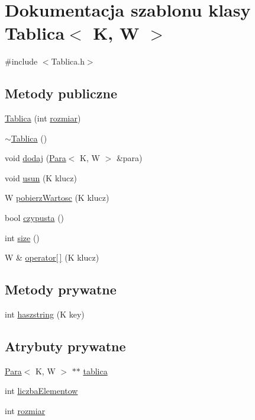 \hypertarget{class_tablica}{\section{\-Dokumentacja szablonu klasy \-Tablica$<$ \-K, \-W $>$}
\label{class_tablica}
}


{\ttfamily \#include $<$\-Tablica.\-h$>$}

\subsection*{\-Metody publiczne}
\begin{DoxyCompactItemize}
\item 
\hyperlink{class_tablica_ae1408ffc077347605b61ea0899ddebed}{\-Tablica} (int \hyperlink{class_tablica_a40b3c86ceb2ec860b9d19ce0e866b406}{rozmiar})
\item 
\hyperlink{class_tablica_aabb6e01e32fd2d32ddcfba2c10b9ec5e}{$\sim$\-Tablica} ()
\item 
void \hyperlink{class_tablica_aebb17d3366e37c8b4852df08eae2a1de}{dodaj} (\hyperlink{class_para}{\-Para}$<$ \-K, \-W $>$ \&para)
\item 
void \hyperlink{class_tablica_a061a219dd25c6696940f40226d99a99d}{usun} (\-K klucz)
\item 
\-W \hyperlink{class_tablica_a6de46e3062f16d78c4cb2cf18c9b0de1}{pobierz\-Wartosc} (\-K klucz)
\item 
bool \hyperlink{class_tablica_a19d8da0353d73517375cf6b2984f9d5c}{czypusta} ()
\item 
int \hyperlink{class_tablica_aabc40f316cf398a07e3035b1c4adc256}{size} ()
\item 
\-W \& \hyperlink{class_tablica_a7f5a2d2ebe594ec98dd38dfbbb83497d}{operator\mbox{[}$\,$\mbox{]}} (\-K klucz)
\end{DoxyCompactItemize}
\subsection*{\-Metody prywatne}
\begin{DoxyCompactItemize}
\item 
int \hyperlink{class_tablica_a8fd66d75553eb44aa043f917fd9317dc}{haszstring} (\-K key)
\end{DoxyCompactItemize}
\subsection*{\-Atrybuty prywatne}
\begin{DoxyCompactItemize}
\item 
\hyperlink{class_para}{\-Para}$<$ \-K, \-W $>$ $\ast$$\ast$ \hyperlink{class_tablica_a0d6b03ac0a2b996d4096038ef9315e9a}{tablica}
\item 
int \hyperlink{class_tablica_a603b571fcc0d29b757bfd5fe27d0fadc}{liczba\-Elementow}
\item 
int \hyperlink{class_tablica_a40b3c86ceb2ec860b9d19ce0e866b406}{rozmiar}
\end{DoxyCompactItemize}


